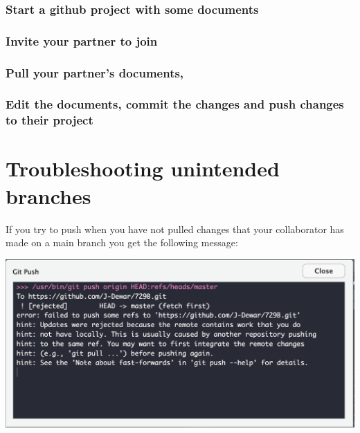 \documentclass[
  letterpaper,
  DIV=11,
  numbers=noendperiod]{scrartcl}
\begin{document}
\hypertarget{start-a-github-project-with-some-documents}{%
\subsubsection{Start a github project with some
documents}\label{start-a-github-project-with-some-documents}}

\hypertarget{invite-your-partner-to-join}{%
\subsubsection{Invite your partner to
join}\label{invite-your-partner-to-join}}

\hypertarget{pull-your-partners-documents}{%
\subsubsection{Pull your partner's
documents,}\label{pull-your-partners-documents}}

\hypertarget{edit-the-documents-commit-the-changes-and-push-changes-to-their-project}{%
\subsubsection{Edit the documents, commit the changes and push changes
to their
project}\label{edit-the-documents-commit-the-changes-and-push-changes-to-their-project}}

\hypertarget{troubleshooting-unintended-branches}{%
\section{Troubleshooting unintended
branches}\label{troubleshooting-unintended-branches}}

If you try to push when you have not pulled changes that your
collaborator has made on a main branch you get the following message:

\includegraphics{figures/34.png}
\end{document}
